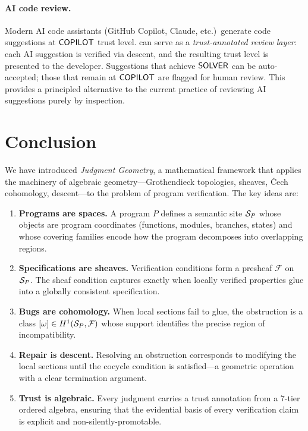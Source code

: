 \paragraph{AI code review.}
Modern AI code assistants (GitHub Copilot, Claude, etc.)\ generate
code suggestions at $\mathsf{COPILOT}$ trust level.  \JuGeo{} can
serve as a \emph{trust-annotated review layer}: each AI suggestion
is verified via descent, and the resulting trust level is presented
to the developer.  Suggestions that achieve $\mathsf{SOLVER}$ can be
auto-accepted; those that remain at $\mathsf{COPILOT}$ are flagged for
human review.  This provides a principled alternative to the
current practice of reviewing AI suggestions purely by inspection.


\section{Conclusion}\label{sec:conclusion}

We have introduced \emph{Judgment Geometry}, a mathematical framework
that applies the machinery of algebraic geometry---Grothendieck
topologies, sheaves, \v{C}ech cohomology, descent---to the problem of
program verification.  The key ideas are:

\begin{enumerate}[leftmargin=1.5em]
  \item \textbf{Programs are spaces.}  A program $P$ defines a
    semantic site $\mathcal{S}_P$ whose objects are program coordinates
    (functions, modules, branches, states) and whose covering families
    encode how the program decomposes into overlapping regions.

  \item \textbf{Specifications are sheaves.}  Verification conditions
    form a presheaf $\mathcal{F}$ on $\mathcal{S}_P$.  The sheaf condition
    captures exactly when locally verified properties glue into a
    globally consistent specification.

  \item \textbf{Bugs are cohomology.}  When local sections fail to
    glue, the obstruction is a class $[\omega] \in H^{1}(\mathcal{S}_P,
    \mathcal{F})$ whose support identifies the precise region of
    incompatibility.

  \item \textbf{Repair is descent.}  Resolving an obstruction
    corresponds to modifying the local sections until the cocycle
    condition is satisfied---a geometric operation with a clear
    termination argument.

  \item \textbf{Trust is algebraic.}  Every judgment carries a trust
    annotation from a 7-tier ordered algebra, ensuring that the
    evidential basis of every verification claim is explicit and
    non-silently-promotable.
\end{enumerate}

